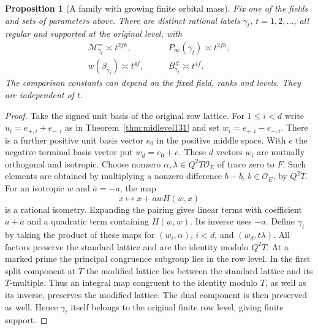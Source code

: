 \documentclass[a4paper,11pt]{article}
\newtheorem{proposition}{Proposition}[section]
\theoremstyle{definition}
\theoremstyle{remark}
\numberwithin{equation}{section}
\begin{document}
\begin{proposition}[A family with growing finite orbital mass]
\label{prop:escape217}
Fix one of the fields and sets of parameters above. There are
distinct rational labels \(\gamma_t\), \(t=1,2,\ldots\), all
regular and supported at the original level, with
\begin{align*}
 \mathcal M_{\gamma_t}^{=}\asymp t^{2fh},\qquad&
          P_\infty(\gamma_t)\asymp t^{2fh},\\
 w(\beta_{\gamma_t})\asymp t^{4f},\qquad&
          B_{\gamma_t}^\#\asymp t^{4f}.
\end{align*}
The comparison constants can depend on the fixed field, ranks
and levels. They are independent of \(t\).
\end{proposition}
\begin{proof}
Take the signed unit basis of the original row lattice.
For \(1\le i<d\) write \(u_i=e_{+,i}+e_{-,i}\) as in
Theorem~\ref{thm:midlevel131} and set \(w_i=e_{+,i}-e_{-,i}\).
There is a further positive unit basis vector \(e_0\) in the
positive middle space. With \(e\) the negative terminal basis
vector put \(w_d=e_0+e\). These \(d\) vectors \(w_i\) are
mutually orthogonal and isotropic. Choose nonzero
\(\alpha,\lambda\in Q^2T\mathcal O_E\) of trace zero to \(F\).
Such elements are obtained by multiplying a nonzero difference
\(b-\bar b\), \(b\in\mathcal O_E\), by \(Q^2T\).
For an isotropic \(w\) and \(\bar a=-a\), the map
\[
                   x\longmapsto x+a w H(w,x)
\]
is a rational isometry. Expanding the pairing gives linear
terms with coefficient \(a+\bar a\) and a quadratic term
containing \(H(w,w)\). Its inverse uses \(-a\).
Define \(\gamma_t\) by taking the product of these maps for
\((w_i,\alpha)\), \(i<d\), and \((w_d,t\lambda)\). All factors
preserve the standard lattice and are the identity modulo
\(Q^2T\). At a marked prime the principal congruence subgroup
lies in the row level. In the first split component at \(T\)
the modified lattice lies between the standard lattice and
its \(T\)-multiple. Thus an integral map congruent to the
identity modulo \(T\), as well as its inverse, preserves the
modified lattice. The dual component is then preserved as
well. Hence \(\gamma_t\) itself belongs to the original finite
row level, giving finite support.


\end{proof}
\end{document}
